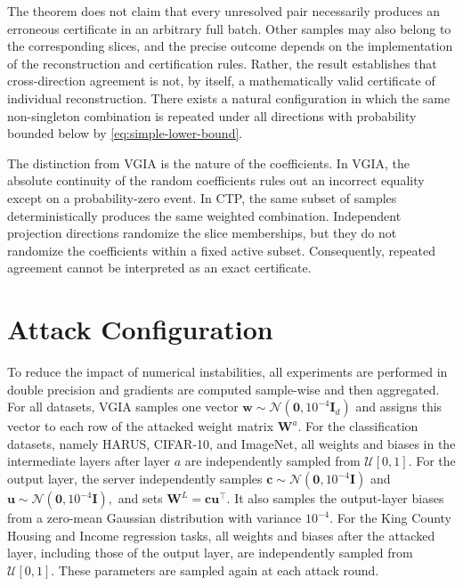The theorem does not claim that every unresolved pair necessarily
produces an erroneous certificate in an arbitrary full batch. Other
samples may also belong to the corresponding slices, and the precise
outcome depends on the implementation of the reconstruction and
certification rules. Rather, the result establishes that
cross-direction agreement is not, by itself, a mathematically valid
certificate of individual reconstruction. There exists a natural
configuration in which the same non-singleton combination is repeated
under all directions with probability bounded below by
\eqref{eq:simple-lower-bound}.

The distinction from VGIA is the nature of the coefficients. In VGIA,
the absolute continuity of the random coefficients rules out an
incorrect equality except on a probability-zero event. In CTP, the
same subset of samples deterministically produces the same
weighted combination. Independent projection directions randomize
the slice memberships, but they do not randomize the coefficients
within a fixed active subset. Consequently, repeated agreement cannot
be interpreted as an exact certificate.

\section{Attack Configuration}\label{app:exp_setup}

To reduce the impact of numerical instabilities, all experiments are performed in double precision and gradients are computed sample-wise and then aggregated. 
For all datasets, VGIA samples one vector $\mathbf{w}\sim\mathcal{N}\left(\mathbf{0},10^{-4}\mathbf{I}_d\right)$
and assigns this vector to each row of the attacked weight matrix $\mathbf{W}^a$. For the classification datasets, namely HARUS, CIFAR-10, and ImageNet, all weights and biases in the intermediate layers after layer $a$ are independently sampled from $\mathcal{U}[0,1]$. For the output layer, the server independently samples $\mathbf{c}\sim\mathcal{N}\left(\mathbf{0},10^{-4}\mathbf{I}\right)$ and $
\mathbf{u}\sim\mathcal{N}\left(\mathbf{0},10^{-4}\mathbf{I}\right),$ and sets $\mathbf{W}^{L}=\mathbf{c}\mathbf{u}^{\top}$. It also samples the output-layer biases from a zero-mean Gaussian distribution with variance $10^{-4}$. For the King County Housing and Income regression tasks, all weights and biases after the attacked layer, including those of the output layer, are independently sampled from $\mathcal{U}[0,1]$. These parameters are sampled again at each attack round.

